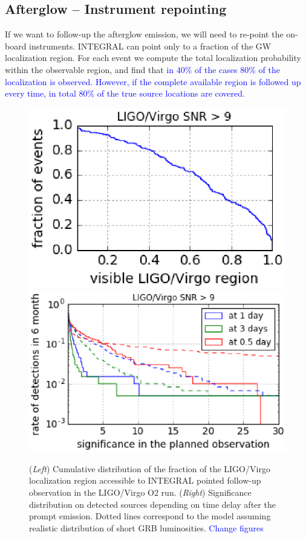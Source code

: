 \documentclass[11pt]{article}
\begin{document}
\subsection*{Afterglow -- Instrument repointing}

If we want to follow-up the afterglow emission, we will need to re-point the on-board instruments.
INTEGRAL can point only to a fraction of the GW localization region. For each
event we compute the total localization probability within the observable
region, and find that \textcolor{blue}{in 40\% of the cases 80\% of the localization is
observed. However, if the complete available region is followed up every
time, in total 80\% of the true source locations are covered.}

\begin{figure}[!ht]
	\centering
  	\includegraphics[scale=.5]{P7-1_f3.eps}
  	\includegraphics[scale=.4]{P7-1_f4.eps}

  	\caption{(\textit{Left}) Cumulative distribution of the
    fraction of the LIGO/Virgo localization region accessible to
    INTEGRAL pointed follow-up observation in the LIGO/Virgo O2
    run. (\textit{Right}) Significance distribution on detected
    sources depending on time delay after the prompt emission. Dotted
    lines correspond to the model assuming realistic distribution of short GRB luminosities. \textcolor{blue}{Change figures}}
    \label{covered_region}
\end{figure}
\end{document}
